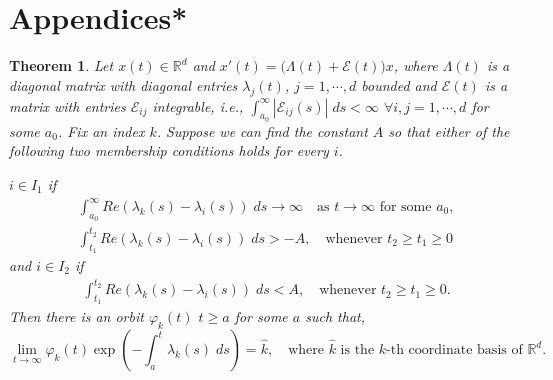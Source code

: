 \documentclass[a4paper,11pt]{article}
\newcounter{Theorem}
\newtheorem{theorem}[Theorem]{Theorem}
\theoremstyle{remark}
\begin{document}
\section{Appendices*}

\begin{theorem}{\cite[Levinson's Theorem]{CL55}}\label{thm:CL} Let $x(t)\in \mathbb{R}^d$ and $x'(t) = \big(\Lambda(t) + \mathcal{E}(t)\big)x$, where $\Lambda(t)$ is a diagonal matrix with diagonal entries $\lambda_j(t)$, $j=1,\cdots,d$ bounded and $\mathcal{E}(t)$ is a matrix with entries $\mathcal{E}_{ij}$ integrable, i.e., $\int_{a_0}^\infty |\mathcal{E}_{ij}(s)|\; ds < \infty$ $\forall i,j=1,\cdots,d$ for some $a_0$.
Fix an index $k$. Suppose we can find the constant $A$ so that either of the following two membership conditions holds for every $i$.

$i \in I_1$ if
\begin{align}
 &\int_{a_0}^\infty Re(\lambda_k(s) -\lambda_i(s))\; ds \rightarrow \infty \quad \text{as $t \rightarrow \infty$ for some $a_0$},\label{eq:I1cond1}\\
 &\int_{t_1}^{t_2} Re(\lambda_k(s) -\lambda_i(s))\; ds > -A, \quad \text{whenever $t_2\ge t_1\ge 0$} \label{eq:I1cond2}
\end{align}
and $i \in I_2$ if
\begin{align}
 &\int_{t_1}^{t_2} Re(\lambda_k(s) -\lambda_i(s))\; ds < A, \quad \text{whenever $t_2\ge t_1\ge 0$}. \label{eq:I2cond}
\end{align}
Then there is an orbit $\varphi_k(t)$ $t\ge a$ for some $a$ such that,
\begin{equation}
 \lim_{t \rightarrow \infty} \varphi_k(t) \exp\left(-\int_{a}^t \lambda_k(s)\; ds\right) = \hat{k}, \quad \text{where $\hat{k}$ is the $k$-th coordinate basis of $\mathbb{R}^d$.}
\end{equation}
\end{theorem}
\end{document}
